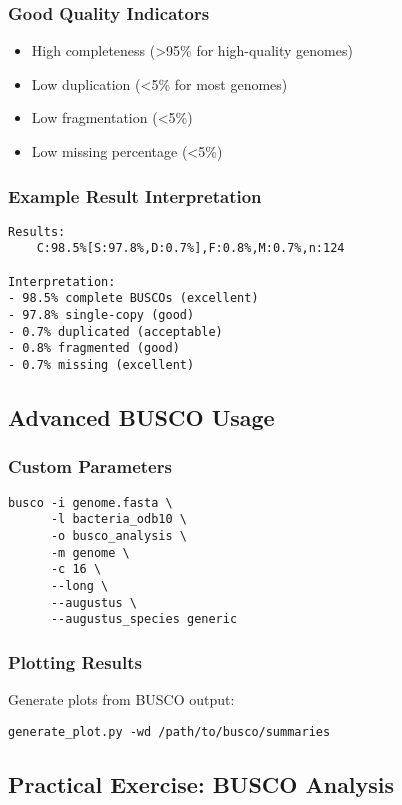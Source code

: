\subsubsection{Good Quality Indicators}
\begin{itemize}
    \item High completeness (>95\% for high-quality genomes)
    \item Low duplication (<5\% for most genomes)
    \item Low fragmentation (<5\%)
    \item Low missing percentage (<5\%)
\end{itemize}

\subsubsection{Example Result Interpretation}
\begin{verbatim}
Results:
    C:98.5%[S:97.8%,D:0.7%],F:0.8%,M:0.7%,n:124
    
Interpretation:
- 98.5% complete BUSCOs (excellent)
- 97.8% single-copy (good)
- 0.7% duplicated (acceptable)
- 0.8% fragmented (good)
- 0.7% missing (excellent)
\end{verbatim}

\subsection{Advanced BUSCO Usage}

\subsubsection{Custom Parameters}
\begin{verbatim}
busco -i genome.fasta \
      -l bacteria_odb10 \
      -o busco_analysis \
      -m genome \
      -c 16 \
      --long \
      --augustus \
      --augustus_species generic
\end{verbatim}

\subsubsection{Plotting Results}
Generate plots from BUSCO output:
\begin{verbatim}
generate_plot.py -wd /path/to/busco/summaries
\end{verbatim}

\subsection{Practical Exercise: BUSCO Analysis}

